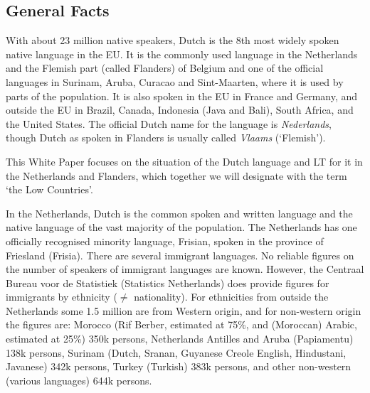 
\begin{multicols}{2}

\subsection{General Facts}

    With about 23 million native speakers, Dutch is the 8th most widely spoken native language in the EU. It is the commonly used language in the Netherlands and the Flemish part (called Flanders) of Belgium and one of the official languages in Surinam, Aruba, Curacao and Sint-Maarten, where it is used by parts of the population. It is also spoken in the EU in France and Germany, and outside the EU in Brazil, Canada, Indonesia (Java and Bali), South Africa, and the United States.  The official Dutch name for the language is \textit{Nederlands}, though Dutch as spoken in Flanders is usually called \textit{Vlaams} (`Flemish').

    This White Paper focuses on the situation of the Dutch language and LT for it in the Netherlands and Flanders, which together we will designate with the term `the Low Countries'.

    In the Netherlands, Dutch is the common spoken and written language and the native language of the vast majority of the population. The Netherlands has one officially recognised minority language, Frisian, spoken in the province of Friesland (Frisia). There are several immigrant languages. No reliable figures on the number of speakers of immigrant languages are known. However, the Centraal Bureau voor de Statistiek (Statistics Netherlands) \cite{CBS}  does provide figures for immigrants by ethnicity ($\neq$ nationality). For ethnicities from outside the Netherlands some 1.5 million are from Western origin, and for non-western origin the figures are: Morocco (Rif Berber, estimated at 75\%, and (Moroccan) Arabic, estimated at 25\%) 350k persons, Netherlands Antilles and Aruba (Papiamentu) 138k persons, Surinam (Dutch, Sranan, Guyanese Creole English, Hindustani, Javanese) 342k persons, Turkey (Turkish) 383k persons, and other non-western (various languages) 644k persons.



\end{multicols}
